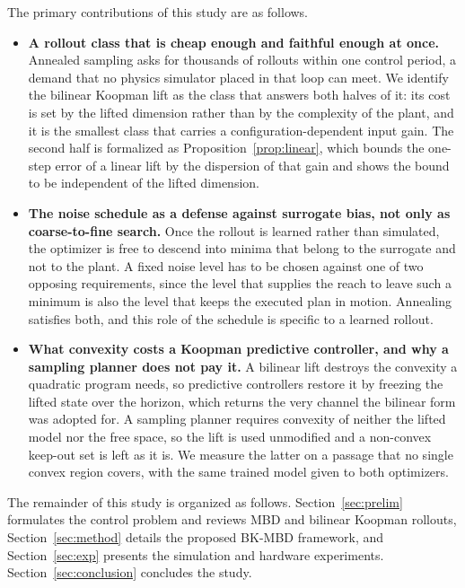 \documentclass[letterpaper,10pt,conference]{ieeeconf}
\newcommand{\bkmbd}{\textsc{BK-MBD}}
\begin{document}
The primary contributions of this study are as follows.
\begin{itemize}
\item \textbf{A rollout class that is cheap enough and faithful enough at once.}
Annealed sampling asks for thousands of rollouts within one control period, a demand that no physics simulator placed in that loop can meet.
We identify the bilinear Koopman lift as the class that answers both halves of it: its cost is set by the lifted dimension rather than by the complexity of the plant, and it is the smallest class that carries a configuration-dependent input gain.
The second half is formalized as Proposition~\ref{prop:linear}, which bounds the one-step error of a linear lift by the dispersion of that gain and shows the bound to be independent of the lifted dimension.

\item \textbf{The noise schedule as a defense against surrogate bias, not only as coarse-to-fine search.}
Once the rollout is learned rather than simulated, the optimizer is free to descend into minima that belong to the surrogate and not to the plant.
A fixed noise level has to be chosen against one of two opposing requirements, since the level that supplies the reach to leave such a minimum is also the level that keeps the executed plan in motion.
Annealing satisfies both, and this role of the schedule is specific to a learned rollout.

\item \textbf{What convexity costs a Koopman predictive controller, and why a sampling planner does not pay it.}
A bilinear lift destroys the convexity a quadratic program needs, so predictive controllers restore it by freezing the lifted state over the horizon, which returns the very channel the bilinear form was adopted for.
A sampling planner requires convexity of neither the lifted model nor the free space, so the lift is used unmodified and a non-convex keep-out set is left as it is.
We measure the latter on a passage that no single convex region covers, with the same trained model given to both optimizers.
\end{itemize}

The remainder of this study is organized as follows.
Section~\ref{sec:prelim} formulates the control problem and reviews MBD and bilinear Koopman rollouts, Section~\ref{sec:method} details the proposed \bkmbd{} framework, and Section~\ref{sec:exp} presents the simulation and hardware experiments.
Section~\ref{sec:conclusion} concludes the study.
\end{document}
